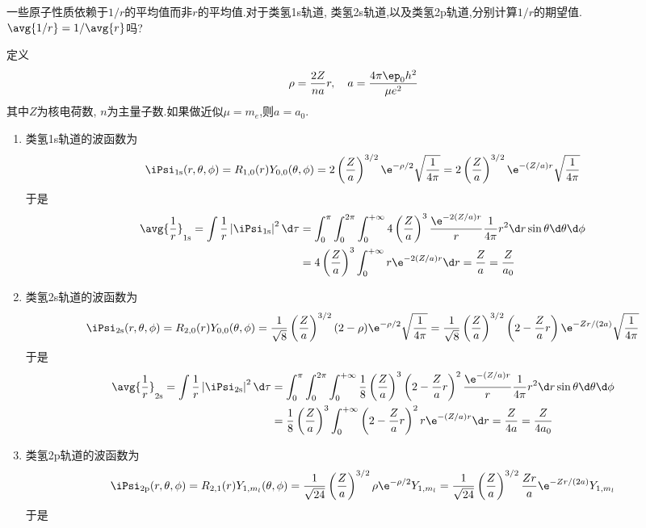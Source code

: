 \documentclass{ctexart}
\begin{document}
\begin{homework}[3.]
    一些原子性质依赖于$1/r$的平均值而非$r$的平均值.对于类氢1s轨道, 类氢2s轨道,以及类氢2p轨道,分别计算$1/r$的期望值. $\avg{1/r}=1/\avg{r}$吗?
\end{homework}
\begin{solution}
定义
\[\rho=\dfrac{2Z}{na}r,\quad a=\dfrac{4\pi\ep_0h^2}{\mu e^2}\]
其中$Z$为核电荷数, $n$为主量子数.如果做近似$\mu=m_e$,则$a=a_0$.
\begin{enumerate}[label=\tbf{(\alph*)}]
    \item 类氢1s轨道的波函数为
    \[\iPsi_{1\text{s}}(r,\theta,\phi)=R_{1,0}(r)Y_{0,0}(\theta,\phi)=2\left(\dfrac{Z}{a}\right)^{3/2}\e^{-\rho/2}\sqrt{\dfrac{1}{4\pi}}=2\left(\dfrac{Z}{a}\right)^{3/2}\e^{-(Z/a)r}\sqrt{\dfrac{1}{4\pi}}\]
    于是
    \[\begin{aligned}
        \avg{\dfrac1r}_{1\text{s}}=\int\dfrac{1}{r}\left|\iPsi_{1\text{s}}\right|^2\d\tau
        &=\int_0^\pi\int_0^{2\pi}\int_0^{+\infty}4\left(\dfrac{Z}{a}\right)^3\dfrac{\e^{-2(Z/a)r}}{r}\dfrac{1}{4\pi}r^2\d r\sin\theta\d\theta\d\phi\\
        &=4\left(\dfrac{Z}{a}\right)^3\int_0^{+\infty}r\e^{-2(Z/a)r}\d r=\dfrac{Z}{a}=\dfrac{Z}{a_0}
    \end{aligned}\]
    \item 类氢2s轨道的波函数为
    \[\iPsi_{2\text{s}}(r,\theta,\phi)=R_{2,0}(r)Y_{0,0}(\theta,\phi)=\dfrac{1}{\sqrt8}\left(\dfrac{Z}{a}\right)^{3/2}(2-\rho)\e^{-\rho/2}\sqrt{\dfrac{1}{4\pi}}=\dfrac{1}{\sqrt8}\left(\dfrac{Z}{a}\right)^{3/2}\left(2-\dfrac{Z}{a}r\right)\e^{-Zr/(2a)}\sqrt{\dfrac{1}{4\pi}}\]
    于是
    \[\begin{aligned}
        \avg{\dfrac1r}_{2\text{s}}=\int\dfrac{1}{r}\left|\iPsi_{2\text{s}}\right|^2\d\tau
        &=\int_0^\pi\int_0^{2\pi}\int_0^{+\infty}\dfrac{1}{8}\left(\dfrac{Z}{a}\right)^3\left(2-\dfrac{Z}{a}r\right)^2\dfrac{\e^{-(Z/a)r}}{r}\dfrac{1}{4\pi}r^2\d r\sin\theta\d\theta\d\phi\\
        &=\dfrac{1}{8}\left(\dfrac{Z}{a}\right)^3\int_0^{+\infty}\left(2-\dfrac{Z}{a}r\right)^2r\e^{-(Z/a)r}\d r=\dfrac{Z}{4a}=\dfrac{Z}{4a_0}
    \end{aligned}\]
    \item 类氢2p轨道的波函数为
    \[\iPsi_{2\text{p}}(r,\theta,\phi)=R_{2,1}(r)Y_{1,m_l}(\theta,\phi)=\dfrac{1}{\sqrt{24}}\left(\dfrac{Z}{a}\right)^{3/2}\rho\e^{-\rho/2}Y_{1,m_l}=\dfrac{1}{\sqrt{24}}\left(\dfrac{Z}{a}\right)^{3/2}\dfrac{Zr}{a}\e^{-Zr/(2a)}Y_{1,m_l}\]
    于是

\end{enumerate}
\end{solution}
\end{document}

